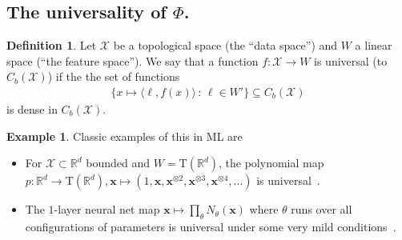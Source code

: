 \documentclass{article} \usepackage{iclr2021_conference,times}
\newcommand{\R}{\mathbb{R}}
\newcommand{\bx}{\mathbf{x}}
\newcommand{\cX}{\mathcal{X}}
\newcommand{\T}[1]{\mathrm{T}({#1})}
\theoremstyle{plain}
\theoremstyle{definition}
\newtheorem{definition}[thm]{Definition}
\newtheorem{example}[thm]{Example}
\begin{document}
\subsection{The universality of $\Phi$.}\label{app:phi universal}


\begin{definition}
  Let $\cX$ be a topological space (the ``data space'') and $W$ a linear space (``the feature space'').
	We say that a function $ f: \cX \to W $ is universal (to $C_b(\cX)$) if the the set of functions
		\begin{align}
		\{ x \mapsto \langle \ell, f(x) \rangle \,:\, \ell \in W' \} \subseteq C_b(\cX)
		\end{align}
		is dense in $ C_b(\cX) $.
	\end{definition}
	
\begin{example} Classic examples of this in ML are 
		\begin{itemize}
			\item For $\cX\subset\R^d$ bounded and $W=\T{\R^d}$, the polynomial map $ p : \R^d \to \T{\R^d}, \bx \mapsto (1, \bx, \bx^{\otimes 2}, \bx^{\otimes 3}, \bx^{\otimes 4}, \ldots) $ is universal~\citep{rudin}.
			\item The $ 1 $-layer neural net map $ \bx \mapsto \prod_\theta N_\theta(\bx) $ where $ \theta $ runs over all configurations of parameters is universal under some very mild conditions~\citep{hornik1991approximation}.
		\end{itemize}
	\end{example}
\end{document}

